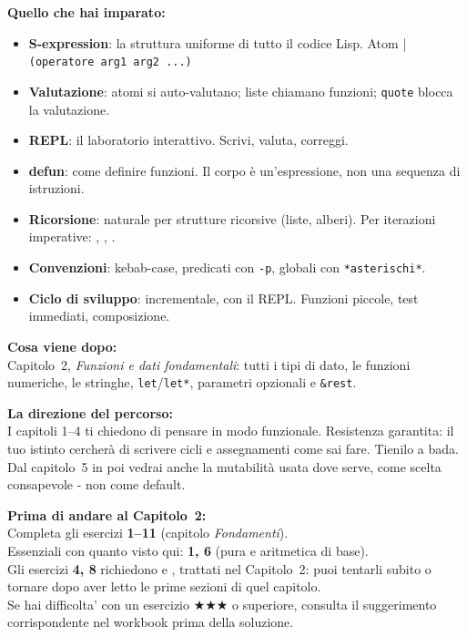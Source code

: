 \begin{tcolorbox}[
  enhanced,
  colback=csBlue!5,
  colframe=csBlue!40,
  arc=4pt,
  boxrule=0.6pt,
  left=14pt, right=14pt, top=12pt, bottom=12pt,
  before skip=16pt,
  after skip=16pt
]
\textbf{Quello che hai imparato:}

\medskip
\begin{itemize}
  \item \textbf{S-expression}: la struttura uniforme di tutto il codice Lisp.
        Atom | \texttt{(operatore arg1 arg2 ...)}
  \item \textbf{Valutazione}: atomi si auto-valutano; liste chiamano funzioni;
        \texttt{quote} blocca la valutazione.
  \item \textbf{REPL}: il laboratorio interattivo. Scrivi, valuta, correggi.
  \item \textbf{defun}: come definire funzioni. Il corpo è un'espressione,
        non una sequenza di istruzioni.
  \item \textbf{Ricorsione}: naturale per strutture ricorsive (liste, alberi).
        Per iterazioni imperative: , , .
  \item \textbf{Convenzioni}: kebab-case, predicati con \texttt{-p},
        globali con \texttt{*asterischi*}.
  \item \textbf{Ciclo di sviluppo}: incrementale, con il REPL.
        Funzioni piccole, test immediati, composizione.
\end{itemize}

\medskip
\textbf{Cosa viene dopo:}\\
Capitolo~2, \emph{Funzioni e dati fondamentali}: tutti i tipi di dato,
le funzioni numeriche, le stringhe, \texttt{let}/\texttt{let*},
parametri opzionali e \texttt{\&rest}.

\medskip
\textbf{La direzione del percorso:}\\
I capitoli 1–4 ti chiedono di pensare in modo funzionale.
Resistenza garantita: il tuo istinto cercherà di scrivere cicli
e assegnamenti come sai fare. Tienilo a bada.
Dal capitolo~5 in poi vedrai anche la mutabilità usata dove serve,
come scelta consapevole - non come default.
\end{tcolorbox}

\begin{workbook}
\textbf{Prima di andare al Capitolo~2:}\\[4pt]
Completa gli esercizi \textbf{1--11} (capitolo \emph{Fondamenti}).\\[4pt]
Essenziali con quanto visto qui: \textbf{1, 6}
(pura  e aritmetica di base).\\[4pt]
Gli esercizi \textbf{4, 8} richiedono  e ,
trattati nel Capitolo~2: puoi tentarli subito o tornare dopo
aver letto le prime sezioni di quel capitolo.\\[4pt]
Se hai difficolta' con un esercizio \textbf{$\bigstar\bigstar\bigstar$} o superiore,
consulta il suggerimento corrispondente nel workbook prima della soluzione.
\end{workbook}
